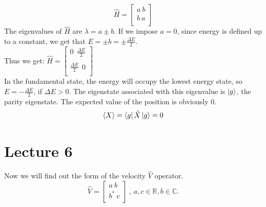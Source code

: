 \documentclass{article}
\begin{document}
$$\hat{H} = \begin{bmatrix}
    a \ b \\
    b \ a \\
\end{bmatrix}$$
The eigenvalues of $\hat{H}$ are $\lambda =  a \pm b$. If we impose $a=0$, since energy is defined up to a constant, we get that $E = \pm b = \pm \frac{\Delta E}{2}$. \\
Thus we get: $\hat{H} = \begin{bmatrix}
    0 \ \ \frac{\Delta E}{2} \\ \\
    \frac{\Delta E}{2} \ \ 0    \\
\end{bmatrix}$\\ 
In the fundamental state, the energy will occupy the lowest energy state, so $E = - \frac{\Delta E}{2}$, if $\Delta E > 0.$ The eigenstate associated with this eigenvalue is $\ket{g}$, the parity eigenstate.
The expected value of the position is obviously 0. 
$$ \langle X \rangle = \bra{g} \hat{X} \ket{g} = 0 $$

\section{Lecture 6}

Now we will find out the form of the velocity $\hat{V}$ operator.
$$\hat{V} = \begin{bmatrix}
    a \  b \\
    b^* \ c \\
\end{bmatrix} \ , \ a,c \in \mathbb{R}, b \in \mathbb{C}. $$
\end{document}
